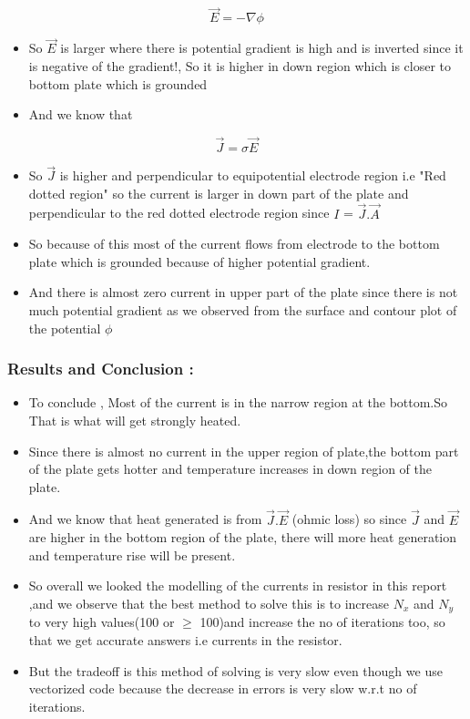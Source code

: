 \documentclass[a4paper,10pt]{article}
\providecommand{\tightlist}{%
      \setlength{\itemsep}{0pt}\setlength{\parskip}{0pt}}
\begin{document}
\begin{equation}
\vec{E} = -\nabla{\phi}
   \end{equation}

\begin{itemize}
\tightlist
\item
  So \(\vec{E}\) is larger where there is potential gradient is high and
  is inverted since it is negative of the gradient!, So it is higher in
  down region which is closer to bottom plate which is grounded
\item
  And we know that
\end{itemize}

\begin{equation}
\vec{J} = \sigma\vec{E}
   \end{equation}

\begin{itemize}
\tightlist
\item
  So \(\vec{J}\) is higher and perpendicular to equipotential electrode
  region i.e "Red dotted region" so the current is larger in down part
  of the plate and perpendicular to the red dotted electrode region
  since \(I\) = \(\vec{J}.\vec{A}\)
\item
  So because of this most of the current flows from electrode to the
  bottom plate which is grounded because of higher potential gradient.
\item
  And there is almost zero current in upper part of the plate since
  there is not much potential gradient as we observed from the surface
  and contour plot of the potential \(\phi\)
\end{itemize}

    \subsubsection{Results and Conclusion :}\label{results-and-conclusion}

\begin{itemize}
\tightlist
\item
  To conclude , Most of the current is in the narrow region at the
  bottom.So That is what will get strongly heated.
\item
  Since there is almost no current in the upper region of plate,the
  bottom part of the plate gets hotter and temperature increases in down
  region of the plate.
\item
  And we know that heat generated is from \(\vec{J}.\vec{E}\) (ohmic
  loss) so since \(\vec{J}\) and \(\vec{E}\) are higher in the bottom
  region of the plate, there will more heat generation and temperature
  rise will be present.
\item
  So overall we looked the modelling of the currents in resistor in this
  report ,and we observe that the best method to solve this is to
  increase \(N_x\) and \(N_y\) to very high values(100 or \(\geq\)
  100)and increase the no of iterations too, so that we get accurate
  answers i.e currents in the resistor.
\item
  But the tradeoff is this method of solving is very slow even though we
  use vectorized code because the decrease in errors is very slow w.r.t
  no of iterations.
\end{itemize}


    
    
    
    
\end{document}
